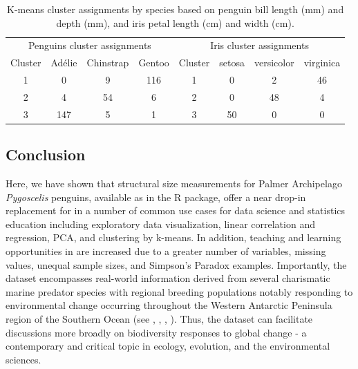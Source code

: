 \begin{Schunk}
\begin{table}

\caption{\label{tab:unnamed-chunk-7}K-means cluster assignments by species based on penguin bill length (mm) and depth (mm), and iris petal length (cm) and width (cm).}
\centering
\begin{tabular}[t]{cccccccc}
\toprule
\multicolumn{4}{c}{Penguins cluster assignments} & \multicolumn{4}{c}{Iris cluster assignments} \\
\cmidrule(l{3pt}r{3pt}){1-4} \cmidrule(l{3pt}r{3pt}){5-8}
Cluster & Adélie & Chinstrap & Gentoo & Cluster & setosa & versicolor & virginica\\
\midrule
1 & 0 & 9 & 116 & 1 & 0 & 2 & 46\\
2 & 4 & 54 & 6 & 2 & 0 & 48 & 4\\
3 & 147 & 5 & 1 & 3 & 50 & 0 & 0\\
\bottomrule
\end{tabular}
\end{table}

\end{Schunk}

\hypertarget{conclusion}{%
\subsection{Conclusion}\label{conclusion}}

Here, we have shown that structural size measurements for Palmer
Archipelago \emph{Pygoscelis} penguins, available as  in
the  R package, offer a near drop-in replacement for
 in a number of common use cases for data science and
statistics education including exploratory data visualization, linear
correlation and regression, PCA, and clustering by k-means. In addition,
teaching and learning opportunities in  are increased due
to a greater number of variables, missing values, unequal sample sizes,
and Simpson's Paradox examples. Importantly, the  dataset
encompasses real-world information derived from several charismatic
marine predator species with regional breeding populations notably
responding to environmental change occurring throughout the Western
Antarctic Peninsula region of the Southern Ocean (see
\citet{bestelmeyer_analysis_2011}, \citet{gorman_ecological_2014},
\citet{gorman_population_2017}, \citet{gorman_advancing_2021}). Thus,
the  dataset can facilitate discussions more broadly on
biodiversity responses to global change - a contemporary and critical
topic in ecology, evolution, and the environmental sciences.

